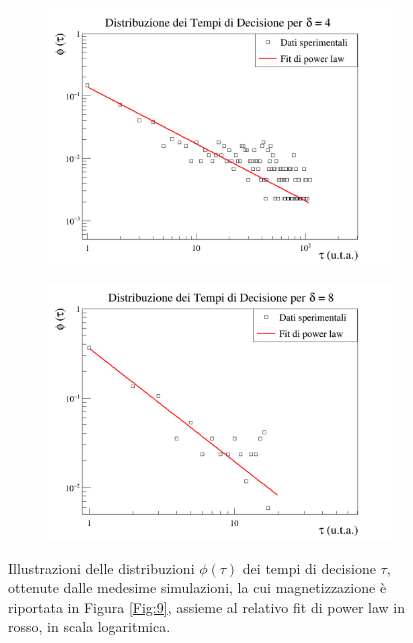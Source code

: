 \documentclass[letterpaper,10pt]{article}
\begin{document}
\begin{figure}
\ContinuedFloat
\centering
\begin{subfigure}{0.8\textwidth}
\includegraphics[width=\linewidth]{Immagini/time_graph_d4.png}
\end{subfigure}
\begin{subfigure}{0.8\textwidth}
\includegraphics[width=\linewidth]{Immagini/time_graph_d8.png}
\end{subfigure}
\caption{Illustrazioni delle distribuzioni $\phi(\tau)$ dei tempi di decisione $\tau$, ottenute dalle medesime simulazioni, la cui magnetizzazione è riportata in Figura \ref{Fig:9}, assieme al relativo fit di power law in rosso, in scala logaritmica.}
\label{Fig:10}
\end{figure}
\end{document}
